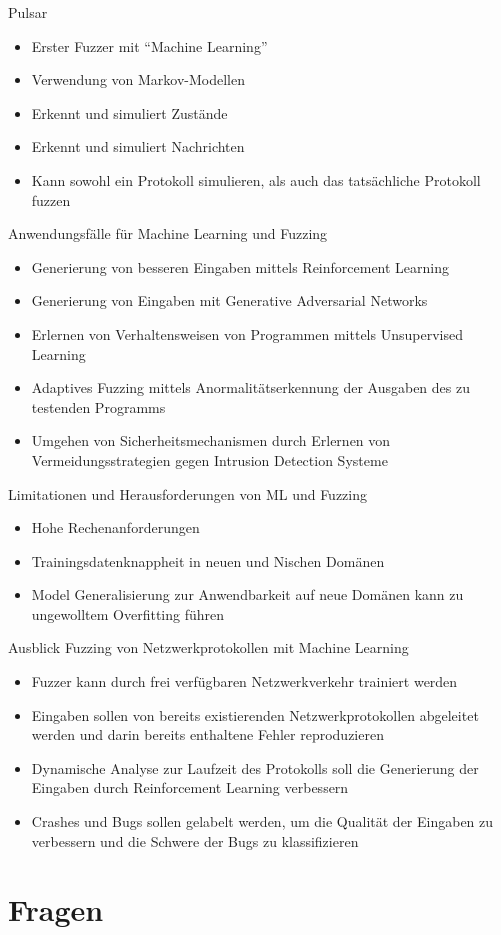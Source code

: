 \begin{frame}{Pulsar}
    \begin{itemize}
        \item Erster Fuzzer mit \enquote{Machine Learning}
        \item Verwendung von Markov-Modellen
        \item Erkennt und simuliert Zustände
        \item Erkennt und simuliert Nachrichten
        \item Kann sowohl ein Protokoll simulieren, als auch das tatsächliche Protokoll fuzzen
    \end{itemize}
\end{frame}
\begin{frame}{Anwendungsfälle für Machine Learning und Fuzzing}
    \begin{itemize}
        \item Generierung von besseren Eingaben mittels Reinforcement Learning
        \item Generierung von Eingaben mit Generative Adversarial Networks
        \item Erlernen von Verhaltensweisen von Programmen mittels Unsupervised Learning
        \item Adaptives Fuzzing mittels Anormalitätserkennung der Ausgaben des zu testenden Programms
        \item Umgehen von Sicherheitsmechanismen durch Erlernen von Vermeidungsstrategien gegen Intrusion Detection Systeme
    \end{itemize}
\end{frame}
\begin{frame}{Limitationen und Herausforderungen von ML und Fuzzing}
    \begin{itemize}
        \item Hohe Rechenanforderungen
        \item Trainingsdatenknappheit in neuen und Nischen Domänen
        \item Model Generalisierung zur Anwendbarkeit auf neue Domänen kann zu ungewolltem Overfitting führen
    \end{itemize}
\end{frame}
\begin{frame}{Ausblick}
    \alert{Fuzzing von Netzwerkprotokollen mit Machine Learning}
    \begin{itemize}
        \item Fuzzer kann durch frei verfügbaren Netzwerkverkehr trainiert werden
        \item Eingaben sollen von bereits existierenden Netzwerkprotokollen abgeleitet werden und darin bereits
        enthaltene Fehler reproduzieren
        \item Dynamische Analyse zur Laufzeit des Protokolls soll die Generierung der Eingaben durch Reinforcement Learning verbessern
        \item Crashes und Bugs sollen gelabelt werden, um die Qualität der Eingaben zu verbessern
        und die Schwere der Bugs zu klassifizieren
    \end{itemize}
\end{frame}
\section{Fragen}\label{sec:fragen}